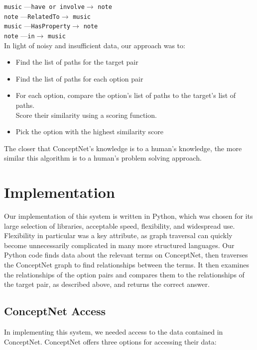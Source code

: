 \documentclass[11pt]{article}
\begin{document}
\verb|music| ---\verb|have or involve|$\rightarrow$ \verb|note|\\
\verb|note| ---\verb|RelatedTo|$\rightarrow$ \verb|music|\\
\verb|music| ---\verb|HasProperty|$\rightarrow$ \verb|note|\\
\verb|note| ---\verb|in|$\rightarrow$ \verb|music|\\

In light of noisy and insufficient data, our approach was to:

\begin{itemize}
\item Find the list of paths for the target pair
\item Find the list of paths for each option pair
\item For each option, compare the option's list of paths to the target's list of paths.\\ Score their similarity using a scoring function.
\item Pick the option with the highest similarity score
\end{itemize}

The closer that ConceptNet's knowledge is to a human's knowledge, the more similar this algorithm is to a human's problem solving approach.

\section{Implementation}

Our implementation of this system is written in Python, which was chosen for its large selection of libraries, acceptable speed, flexibility, and widespread use. Flexibility in particular was a key attribute, as graph traversal can quickly become unnecessarily complicated in many more structured languages. Our Python code finds data about the relevant terms on ConceptNet, then traverses the ConceptNet graph to find relationships between the terms. It then examines the relationships of the option pairs and compares them to the relationships of the target pair, as described above, and returns the correct answer.

\subsection{ConceptNet Access}

In implementing this system, we needed access to the data contained in ConceptNet. ConceptNet offers three options for accessing their data:
\end{document}
